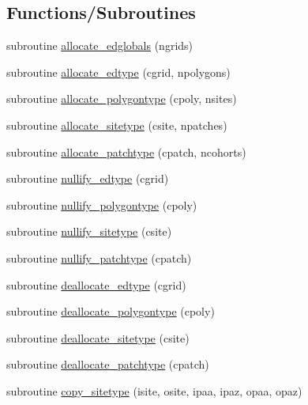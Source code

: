 \subsection*{Functions/\+Subroutines}
\begin{DoxyCompactItemize}
\item 
subroutine \hyperlink{namespaceed__state__vars_a01c02fd632892eb11eaac0daacc106d2}{allocate\+\_\+edglobals} (ngrids)
\item 
subroutine \hyperlink{namespaceed__state__vars_aa47dd5e1964efcbfa0844f75d1763ce5}{allocate\+\_\+edtype} (cgrid, npolygons)
\item 
subroutine \hyperlink{namespaceed__state__vars_ad14e882e6c902118f0e369dd846eeedf}{allocate\+\_\+polygontype} (cpoly, nsites)
\item 
subroutine \hyperlink{namespaceed__state__vars_ac3b987ebbdc7c8cd956eb2634010edb9}{allocate\+\_\+sitetype} (csite, npatches)
\item 
subroutine \hyperlink{namespaceed__state__vars_a4837fc010e19721a127c9a8b04874594}{allocate\+\_\+patchtype} (cpatch, ncohorts)
\item 
subroutine \hyperlink{namespaceed__state__vars_a0df5f674bdb76d915f34b1c6987f6815}{nullify\+\_\+edtype} (cgrid)
\item 
subroutine \hyperlink{namespaceed__state__vars_ade6f2776a02bd9a26ee31fe75cda6170}{nullify\+\_\+polygontype} (cpoly)
\item 
subroutine \hyperlink{namespaceed__state__vars_aa13b6faa5a0031bd5df50581ac0db0ff}{nullify\+\_\+sitetype} (csite)
\item 
subroutine \hyperlink{namespaceed__state__vars_af1a07724c13a8dceb6ba2d3dab21b899}{nullify\+\_\+patchtype} (cpatch)
\item 
subroutine \hyperlink{namespaceed__state__vars_a1d9621375d0d298946b3cd93b47980b9}{deallocate\+\_\+edtype} (cgrid)
\item 
subroutine \hyperlink{namespaceed__state__vars_abea5ee3b5bbe881d86ca62b4de939db3}{deallocate\+\_\+polygontype} (cpoly)
\item 
subroutine \hyperlink{namespaceed__state__vars_a29881891f67226b191026267f094beb9}{deallocate\+\_\+sitetype} (csite)
\item 
subroutine \hyperlink{namespaceed__state__vars_a2845fb7d7264ed3c00651e9e46a16ed8}{deallocate\+\_\+patchtype} (cpatch)
\item 
subroutine \hyperlink{namespaceed__state__vars_a3bf78091394d79aec34dd97e18ff16db}{copy\+\_\+sitetype} (isite, osite, ipaa, ipaz, opaa, opaz)

\end{DoxyCompactItemize}
